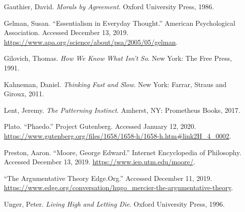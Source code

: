 \documentclass[
  12pt, openany]{book}
\begin{document}
\leavevmode\hypertarget{ref-gauthierMoralsAgreement1986}{}%
Gauthier, David. \emph{Morals by Agreement}. Oxford University Press, 1986.

\leavevmode\hypertarget{ref-gelmanEssentialismEverydayThought}{}%
Gelman, Susan. ``Essentialism in Everyday Thought.'' American Psychological Association. Accessed December 13, 2019. \url{https://www.apa.org/science/about/psa/2005/05/gelman}.

\leavevmode\hypertarget{ref-gilovichHowWeKnow1991}{}%
Gilovich, Thomas. \emph{How We Know What Isn't So}. New York: The Free Press, 1991.

\leavevmode\hypertarget{ref-kahnemanThinkingFastSlow2011}{}%
Kahneman, Daniel. \emph{Thinking Fast and Slow}. New York: Farrar, Straus and Giroux, 2011.

\leavevmode\hypertarget{ref-lentPatterningInstinct2017}{}%
Lent, Jeremy. \emph{The Patterning Instinct}. Amherst, NY: Prometheus Books, 2017.

\leavevmode\hypertarget{ref-platoPhaedo}{}%
Plato. ``Phaedo.'' Project Gutenberg. Accessed January 12, 2020. \url{https://www.gutenberg.org/files/1658/1658-h/1658-h.htm\#link2H_4_0002}.

\leavevmode\hypertarget{ref-prestonMooreGeorgeEdward}{}%
Preston, Aaron. ``Moore, George Edward.'' Internet Encyclopedia of Philosophy. Accessed December 13, 2019. \url{https://www.iep.utm.edu/moore/}.

\leavevmode\hypertarget{ref-ArgumentativeTheoryEdge}{}%
``The Argumentative Theory \textbar{} Edge.Org.'' Accessed December 11, 2019. \url{https://www.edge.org/conversation/hugo_mercier-the-argumentative-theory}.

\leavevmode\hypertarget{ref-ungerLivingHighLetting1996}{}%
Unger, Peter. \emph{Living High and Letting Die}. Oxford University Press, 1996.
\end{document}
